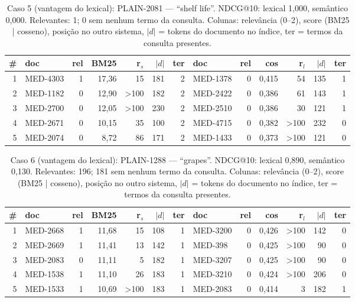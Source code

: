 \begin{table}[!htb]
\centering
\caption{Caso 5 (vantagem do lexical): PLAIN-2081 --- ``shelf life''. NDCG@10: lexical 1,000, semântico 0,000. Relevantes: 1; 0 sem nenhum termo da consulta. Colunas: relevância (0--2), score (BM25 | cosseno), posição no outro sistema, $|d|$ = tokens do documento no índice, ter = termos da consulta presentes.}
\label{tab:case5}
\scriptsize
\begin{tabular}{rlrrrrr|lrrrrr}
\toprule
\# & doc & rel & BM25 & r$_s$ & $|d|$ & ter & doc & rel & cos & r$_l$ & $|d|$ & ter \\
\midrule
1 & MED-4303 & 1 & 17,36 & 15 & 181 & 2 & MED-1378 & 0 & 0,415 & 54 & 135 & 1 \\
2 & MED-1182 & 0 & 12,90 & >100 & 182 & 2 & MED-2422 & 0 & 0,386 & 61 & 143 & 1 \\
3 & MED-2700 & 0 & 12,05 & >100 & 230 & 2 & MED-2510 & 0 & 0,386 & 30 & 121 & 1 \\
4 & MED-2671 & 0 & 10,15 & 35 & 100 & 2 & MED-4715 & 0 & 0,382 & >100 & 232 & 0 \\
5 & MED-2074 & 0 & 8,72 & 86 & 171 & 2 & MED-1433 & 0 & 0,373 & >100 & 121 & 0 \\
\bottomrule
\end{tabular}
\end{table}
\begin{table}[!htb]
\centering
\caption{Caso 6 (vantagem do lexical): PLAIN-1288 --- ``grapes''. NDCG@10: lexical 0,890, semântico 0,130. Relevantes: 196; 181 sem nenhum termo da consulta. Colunas: relevância (0--2), score (BM25 | cosseno), posição no outro sistema, $|d|$ = tokens do documento no índice, ter = termos da consulta presentes.}
\label{tab:case6}
\scriptsize
\begin{tabular}{rlrrrrr|lrrrrr}
\toprule
\# & doc & rel & BM25 & r$_s$ & $|d|$ & ter & doc & rel & cos & r$_l$ & $|d|$ & ter \\
\midrule
1 & MED-2668 & 1 & 11,68 & 15 & 108 & 1 & MED-3200 & 0 & 0,426 & >100 & 142 & 0 \\
2 & MED-2669 & 1 & 11,41 & 13 & 142 & 1 & MED-398 & 0 & 0,425 & >100 & 90 & 0 \\
3 & MED-2083 & 0 & 11,11 & 5 & 182 & 1 & MED-3207 & 0 & 0,425 & >100 & 90 & 0 \\
4 & MED-1538 & 1 & 11,10 & 26 & 183 & 1 & MED-3210 & 0 & 0,424 & >100 & 206 & 0 \\
5 & MED-1533 & 1 & 10,69 & >100 & 183 & 1 & MED-2083 & 0 & 0,414 & 3 & 182 & 1 \\
\bottomrule
\end{tabular}
\end{table}
